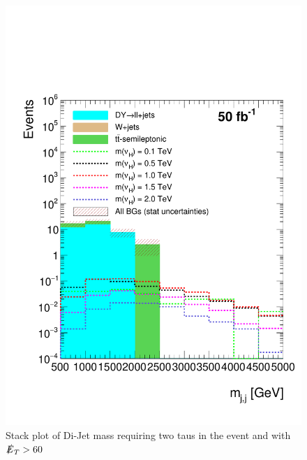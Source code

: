\begin{figure}[H]
\centering
\includegraphics[width=\linewidth]{StackPlots/mjj_2Taus_met60_50ifb_2moreSignals.pdf}
\caption{Stack plot of Di-Jet mass requiring two taus in the event and with $\slashed{E}_{T} > 60$}
\label{fig: mjj2tauMet60}
\end{figure}

